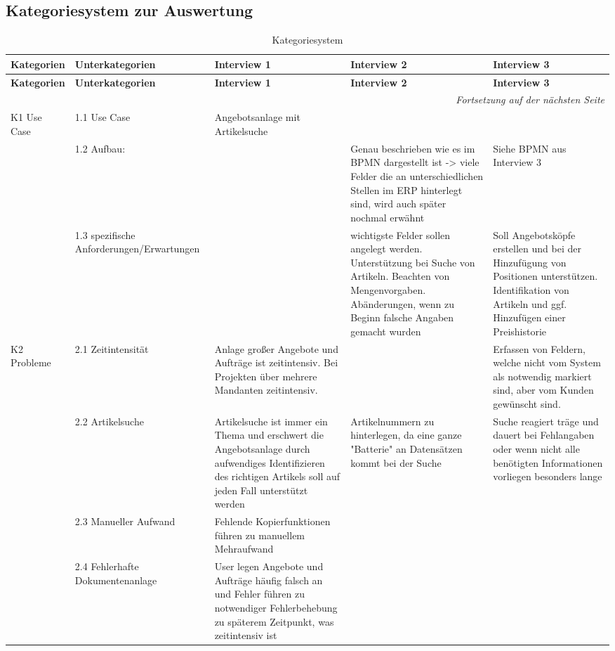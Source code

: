 \subsection{Kategoriesystem zur Auswertung}
\label{anhang:Kategorisierung}
\footnotesize
\begin{longtable}{|p{1.9cm}|p{1.9cm}|p{3cm}|p{3cm}|p{3cm}|}
\caption{Kategoriesystem}\label{tab:kategorien}\\
\hline
\textbf{Kategorien} & \textbf{Unterkategorien} & \textbf{Interview 1} & \textbf{Interview 2} & \textbf{Interview 3} \\
\hline
\endfirsthead

\hline
\textbf{Kategorien} & \textbf{Unterkategorien} & \textbf{Interview 1} & \textbf{Interview 2} & \textbf{Interview 3} \\
\hline
\endhead

\hline
\multicolumn{5}{r}{\emph{Fortsetzung auf der nächsten Seite}}\\
\hline
\endfoot

\hline
\endlastfoot

K1 Use Case & 1.1 Use Case & Angebotsanlage mit Artikelsuche &  &  \\
\hline
 & 1.2 Aufbau: &  & Genau beschrieben wie es im BPMN dargestellt ist -> viele Felder die an unterschiedlichen Stellen im ERP hinterlegt sind, wird auch später nochmal erwähnt & Siehe BPMN aus Interview 3 \\
\hline
 & 1.3 spezifische Anforderungen/Erwartungen &  & wichtigste Felder sollen angelegt werden. Unterstützung bei Suche von Artikeln. Beachten von Mengenvorgaben. Abänderungen, wenn zu Beginn falsche Angaben gemacht wurden & Soll Angebotsköpfe erstellen und bei der Hinzufügung von Positionen unterstützen. Identifikation von Artikeln und ggf. Hinzufügen einer Preishistorie \\
\hline

K2 Probleme & 2.1 Zeitintensität & Anlage großer Angebote und Aufträge ist zeitintensiv. Bei Projekten über mehrere Mandanten zeitintensiv. &  & Erfassen von Feldern, welche nicht vom System als notwendig markiert sind, aber vom Kunden gewünscht sind. \\
\hline
 & 2.2 Artikelsuche & Artikelsuche ist immer ein Thema und erschwert die Angebotsanlage durch aufwendiges Identifizieren des richtigen Artikels soll auf jeden Fall unterstützt werden & Artikelnummern zu hinterlegen, da eine ganze "Batterie" an Datensätzen kommt bei der Suche & Suche reagiert träge und dauert bei Fehlangaben oder wenn nicht alle benötigten Informationen vorliegen besonders lange \\
\hline
 & 2.3 Manueller Aufwand & Fehlende Kopierfunktionen führen zu manuellem Mehraufwand &  &  \\
\hline
 & 2.4 Fehlerhafte Dokumentenanlage & User legen Angebote und Aufträge häufig falsch an und Fehler führen zu notwendiger Fehlerbehebung zu späterem Zeitpunkt, was zeitintensiv ist &  &  \\
\hline


\end{longtable}
